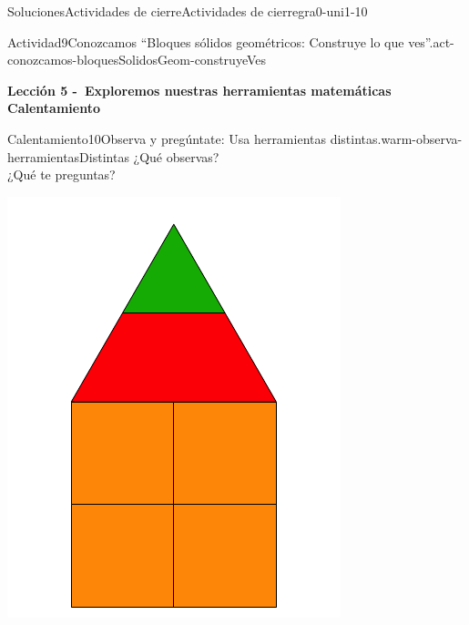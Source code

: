 \documentclass[twoside,10pt,]{article}
\begin{document}
\begin{solutions-section}{Soluciones}{Actividades de cierre}{}{Actividades de cierre}{}{}{gra0-uni1-10}
\begin{activitysolution}{Actividad}{9}{Conozcamos “Bloques sólidos geométricos: Construye lo que ves”.}{act-conozcamos-bloquesSolidosGeom-construyeVes}
\begin{image}{0}{1}{0}{}
\end{image}%
\end{activitysolution}%
\par\medskip
\noindent\textbf{\large{}\space\textperiodcentered\space{}Lección 5 -~Exploremos nuestras herramientas matemáticas\\
\space\textperiodcentered\space{}Calentamiento}
\begin{explorationsolution}{Calentamiento}{10}{Observa y pregúntate: Usa herramientas distintas.}{warm-observa-herramientasDistintas}%
¿Qué observas?\\
 ¿Qué te preguntas?%
\begin{sidebyside}{2}{0.05}{0.05}{0.1}%
\begin{sbspanel}{0.4}%
\includegraphics[width=\linewidth]{external/svg-source/tikz-file-148145.pdf}
\end{sbspanel}%
\begin{sbspanel}{0.4}%

\end{sbspanel}
\end{sidebyside}
\end{explorationsolution}
\end{solutions-section}
\end{document}
